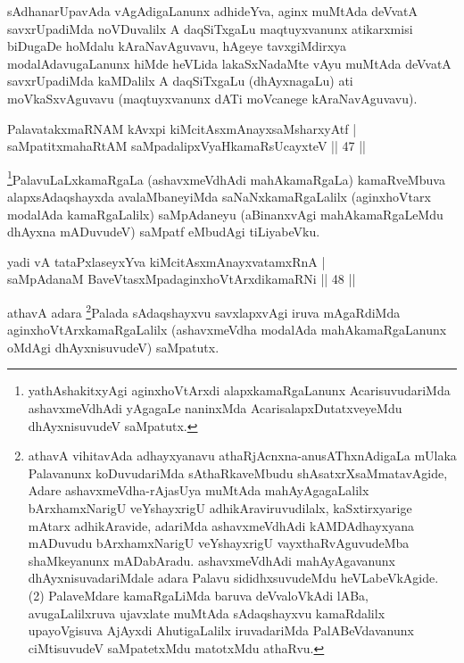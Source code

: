 \begin{artha}
sAdhanarUpavAda vAgAdigaLanunx adhideYva, aginx muMtAda deVvatA savxrUpadiMda noVDuvalilx A daqSiTxgaLu maqtuyxvanunx atikarxmisi biDugaDe hoMdalu kAraNavAguvavu, hAgeye tavxgiMdirxya modalAdavugaLanunx hiMde heVLida lakaSxNadaMte vAyu muMtAda deVvatA savxrUpadiMda kaMDalilx A daqSiTxgaLu (dhAyxnagaLu) ati moVkaSxvAguvavu (maqtuyxvanunx dATi moVcanege kAraNavAguvavu).
\end{artha}


\begin{shl}
PalavatakxmaRNAM kAvxpi kiMcitAsxmAnayxsaMsharxyAtf |\\
saMpatitxmahaRtAM saMpadalipxVyaHkamaRsUcayxteV \hfill || 47 ||
\end{shl}

\begin{artha}
\footnote{yathAshakitxyAgi aginxhoVtArxdi alapxkamaRgaLanunx AcarisuvudariMda ashavxmeVdhAdi yAgagaLe naninxMda AcarisalapxDutatxveyeMdu dhAyxnisuvudeV saMpatutx.}PalavuLaLxkamaRgaLa (ashavxmeVdhAdi mahAkamaRgaLa) kamaRveMbuva alapxsAdaqshayxda avalaMbaneyiMda saNaNxkamaRgaLalilx (aginxhoVtarx modalAda kamaRgaLalilx) saMpAdaneyu (aBinanxvAgi mahAkamaRgaLeMdu dhAyxna mADuvudeV) saMpatf eMbudAgi tiLiyabeVku.
\end{artha}


\begin{shl}
yadi vA tataPxlaseyxYva kiMcitAsxmAnayxvatamxRnA |\\
saMpAdanaM BaveVtasxMpadaginxhoVtArxdikamaRNi \hfill || 48 ||
\end{shl}

\begin{artha}
athavA adara \footnote{athavA vihitavAda adhayxyanavu athaRjAcnxna-anusAThxnAdigaLa mUlaka Palavanunx koDuvudariMda sAthaRkaveMbudu shAsatxrXsaMmatavAgide, Adare ashavxmeVdha-rAjasUya muMtAda mahAyAgagaLalilx bArxhamxNarigU veYshayxrigU adhikAraviruvudilalx, kaSxtirxyarige mAtarx adhikAravide, adariMda ashavxmeVdhAdi kAMDAdhayxyana mADuvudu bArxhamxNarigU veYshayxrigU vayxthaRvAguvudeMba shaMkeyanunx mADabAradu. ashavxmeVdhAdi mahAyAgavanunx dhAyxnisuvadariMdale adara Palavu sididhxsuvudeMdu heVLabeVkAgide. (2) PalaveMdare kamaRgaLiMda baruva deVvaloVkAdi lABa, avugaLalilxruva ujavxlate muMtAda sAdaqshayxvu kamaRdalilx upayoVgisuva AjAyxdi AhutigaLalilx iruvadariMda PalABeVdavanunx ciMtisuvudeV saMpatetxMdu matotxMdu athaRvu.}Palada sAdaqshayxvu savxlapxvAgi iruva mAgaRdiMda aginxhoVtArxkamaRgaLalilx (ashavxmeVdha modalAda mahAkamaRgaLanunx oMdAgi dhAyxnisuvudeV) saMpatutx.
\end{artha}

